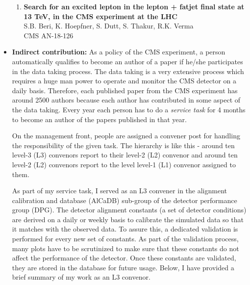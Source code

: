 \begin{itemize}[leftmargin=*]
{\begin{enumerate}[leftmargin=*]
\item
{\bf {Search for an excited lepton in the lepton + fatjet final state at 13 TeV, 
in the CMS experiment at the LHC}}
  \\{}S.B. Beri, K. Hoepfner, S. Dutt, S. Thakur, R.K. Verma
  \\{} CMS AN-18-126
\end{enumerate}
}

\item {\textbf{Indirect contribution:}
As a policy of the CMS experiment, a person automatically qualifies to become an author of a paper
if he/she participates in the data taking process. The data taking is a very extensive
process which requires a huge man power to operate and monitor the CMS detector on a daily basis. Therefore, each published paper from the CMS experiment has around 2500 authors because each author has contributed in some aspect of the data taking. Every year each person has to do a \textit{service task} for 4 months to become an author of the papers published in that year. 

On the management front, people are assigned a convener post for handling the responsibility of the given task. The hierarchy is like this - around ten level-3 (L3) convenors report to their level-2 (L2) convenor and around ten level-2 (L2) convenors report to the level level-1 (L1) convenor assigned to them.

As part of my service task, I served as an L3 convener in the alignment calibration and database (AlCaDB) sub-group of the detector performance group (DPG). The detector alignment constants (a set of detector conditions) are derived on a daily or weekly basis to calibrate the simulated data so that it matches with the observed data. To assure this, a dedicated validation is performed for every new set of constants. As part of the validation process, many  plots have to be scrutinized to make sure that these constants do not affect the performance of the detector. Once these constants are validated, they are stored in the database for future usage. Below, I have provided a brief summary of my work as an L3 convenor. 


}
\end{itemize}
